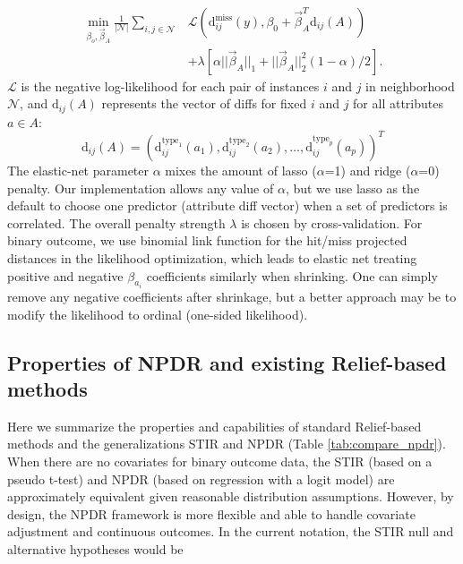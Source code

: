 \documentclass[10pt]{article}
\begin{document}
\begin{equation}\label{eq:glmnetNPDR}
\begin{aligned}
    \min_{\beta_o, \vec{\beta}_A} \frac{1}{|\mathcal{N}|}  \sum_{i,j \in \mathcal{N}} & 
           \mathcal{L} \left(\text{d}^{\text{miss}}_{ij}(y), \beta_0 + \vec{\beta}_A^{T} \text{d}_{ij}(A) \right)
     \\ \nonumber
     & + \lambda \left[ \alpha || \vec{\beta}_A ||_1 + || \vec{\beta}_A ||_2^2 (1-\alpha)/2  \right].
\end{aligned}
\end{equation}
$\mathcal{L}$ is the negative log-likelihood for each pair of instances $i$ and $j$ in neighborhood $\mathcal{N}$, and $\text{d}_{ij}(A)$ represents the vector of diffs for fixed $i$ and $j$ for all attributes $a \in A$: 
\begin{equation}
\text{d}_{ij}(A)= \left( \text{d}^{\text{type}_1}_{ij}(a_1), \text{d}^{\text{type}_2}_{ij}(a_2), \ldots, \text{d}^{\text{type}_p}_{ij}(a_p) \right)^{T}
\end{equation}
The elastic-net parameter $\alpha$ mixes the amount of lasso ($\alpha$=1) and ridge ($\alpha$=0) penalty. Our implementation allows any value of $\alpha$, but we use lasso as the default to choose one predictor (attribute diff vector) when a set of predictors is correlated. The overall penalty strength $\lambda$ is chosen by cross-validation. For binary outcome, we use binomial link function for the hit/miss projected distances in the likelihood optimization, which leads to elastic net treating positive and negative $\beta_{a_i}$ coefficients similarly when shrinking. One can simply remove any negative coefficients after shrinkage, but a better approach may be to modify the likelihood to ordinal (one-sided likelihood).   

\subsection{Properties of NPDR and existing Relief-based methods}
Here we summarize the properties and capabilities of standard Relief-based methods and the generalizations STIR and NPDR (Table \ref{tab:compare_npdr}).
When there are no covariates for binary outcome data, the STIR (based on a pseudo t-test) and NPDR (based on regression with a logit model) are approximately equivalent given reasonable distribution assumptions.
However, by design, the NPDR framework is more flexible and able to handle covariate adjustment and continuous outcomes.
In the current notation, the STIR null and alternative hypotheses would be
\end{document}
